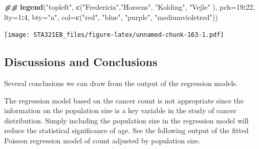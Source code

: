 \documentclass[
]{book}
\newenvironment{Shaded}{\begin{snugshade}}{\end{snugshade}}
\newcommand{\AttributeTok}[1]{\textcolor[rgb]{0.13,0.29,0.53}{#1}}
\newcommand{\DecValTok}[1]{\textcolor[rgb]{0.00,0.00,0.81}{#1}}
\newcommand{\DocumentationTok}[1]{\textcolor[rgb]{0.56,0.35,0.01}{\textbf{\textit{#1}}}}
\newcommand{\FunctionTok}[1]{\textcolor[rgb]{0.13,0.29,0.53}{\textbf{#1}}}
\newcommand{\NormalTok}[1]{#1}
\newcommand{\OtherTok}[1]{\textcolor[rgb]{0.56,0.35,0.01}{#1}}
\newcommand{\SpecialCharTok}[1]{\textcolor[rgb]{0.81,0.36,0.00}{\textbf{#1}}}
\newcommand{\StringTok}[1]{\textcolor[rgb]{0.31,0.60,0.02}{#1}}
\begin{document}
\begin{Shaded}
\begin{Highlighting}[]
\DocumentationTok{\#\#}
\FunctionTok{legend}\NormalTok{(}\StringTok{"topleft"}\NormalTok{, }\FunctionTok{c}\NormalTok{(}\StringTok{"Fredericia"}\NormalTok{,}\StringTok{"Horsens"}\NormalTok{, }\StringTok{"Kolding"}\NormalTok{, }\StringTok{"Vejle"}\NormalTok{ ),}
                  \AttributeTok{pch=}\DecValTok{19}\SpecialCharTok{:}\DecValTok{22}\NormalTok{, }\AttributeTok{lty=}\DecValTok{1}\SpecialCharTok{:}\DecValTok{4}\NormalTok{,  }\AttributeTok{bty=}\StringTok{"n"}\NormalTok{, }
        \AttributeTok{col=}\FunctionTok{c}\NormalTok{(}\StringTok{"red"}\NormalTok{, }\StringTok{"blue"}\NormalTok{, }\StringTok{"purple"}\NormalTok{, }\StringTok{"mediumvioletred"}\NormalTok{))}
\end{Highlighting}
\end{Shaded}

\texttt{[image: STA321EB\_files/figure-latex/unnamed-chunk-163-1.pdf]}

\hypertarget{discussions-and-conclusions-1}{%
\subsection{Discussions and Conclusions}\label{discussions-and-conclusions-1}}

Several conclusions we can draw from the output of the regression models.

The regression model based on the cancer count is not appropriate since the information on the population size is a key variable in the study of cancer distribution. Simply including the population size in the regression model will reduce the statistical significance of age. See the following output of the fitted Poisson regression model of count adjusted by population size.

\begin{Shaded}
\end{Shaded}
\end{document}

